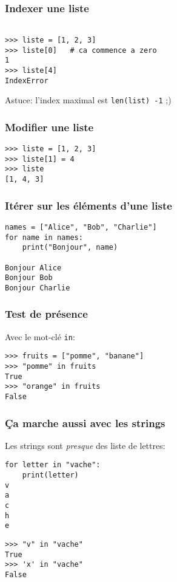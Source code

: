 \documentclass{beamer}
\begin{document}
\begin{frame}[fragile]
  \frametitle{Indexer une liste}

\begin{lstlisting}

>>> liste = [1, 2, 3]
>>> liste[0]   # ca commence a zero
1
>>> liste[4]
IndexError
\end{lstlisting}

\vfill

Astuce: l'index maximal est \texttt{len(list) -1} ;)

\end{frame}

\begin{frame}[fragile]
  \frametitle{Modifier une liste}
\begin{lstlisting}
>>> liste = [1, 2, 3]
>>> liste[1] = 4
>>> liste
[1, 4, 3]
\end{lstlisting}

\end{frame}

\begin{frame}[fragile]
  \frametitle{Itérer sur les éléments d'une liste}
\begin{lstlisting}
names = ["Alice", "Bob", "Charlie"]
for name in names:
    print("Bonjour", name)

Bonjour Alice
Bonjour Bob
Bonjour Charlie
\end{lstlisting}

\end{frame}



\begin{frame}[fragile]
  \frametitle{Test de présence}

Avec le mot-clé \texttt{in}:

\vfill

\begin{lstlisting}
>>> fruits = ["pomme", "banane"]
>>> "pomme" in fruits
True
>>> "orange" in fruits
False
\end{lstlisting}

\end{frame}

\begin{frame}[fragile]
  \frametitle{Ça marche aussi avec les strings}
Les strings sont \emph{presque} des liste de lettres:

\begin{lstlisting}
for letter in "vache":
    print(letter)
v
a
c
h
e
\end{lstlisting}

\begin{lstlisting}
>>> "v" in "vache"
True
>>> 'x' in "vache"
False
\end{lstlisting}

\end{frame}
\end{document}
